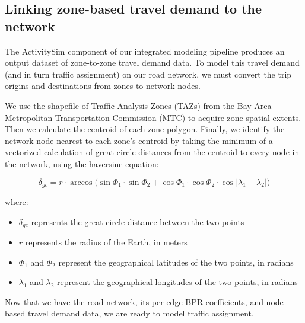 \subsection{Linking zone-based travel demand to the network}

The ActivitySim component of our integrated modeling pipeline produces an output dataset of zone-to-zone travel demand data. To model this travel demand (and in turn traffic assignment) on our road network, we must convert the trip origins and destinations from zones to network nodes.

We use the shapefile of Traffic Analysis Zones (TAZs) from the Bay Area Metropolitan Transportation Commission (MTC) to acquire zone spatial extents. Then we calculate the centroid of each zone polygon. Finally, we identify the network node nearest to each zone's centroid by taking the minimum of a vectorized calculation of great-circle distances from the centroid to every node in the network, using the haversine equation:

\bigskip
\begin{equation}
    \delta_{gc} = r\cdot \arccos{(\sin{\Phi_1}\cdot\sin{\Phi_2} + \cos{\Phi_1}}\cdot\cos{\Phi_2}\cdot\cos{|\lambda_1 - \lambda_2|})
    \label{eq:haversine_formula}
\end{equation}

\bigskip
where:

\bigskip
\begin{itemize}
    \item $\delta_{gc}$ represents the great-circle distance between the two points
    \item $r$ represents the radius of the Earth, in meters
    \item $\Phi_1$ and $\Phi_2$ represent the geographical latitudes of the two points, in radians
    \item $\lambda_1$ and $\lambda_2$ represent the geographical longitudes of the two points, in radians
\end{itemize}

\bigskip
Now that we have the road network, its per-edge BPR coefficients, and node-based travel demand data, we are ready to model traffic assignment.
